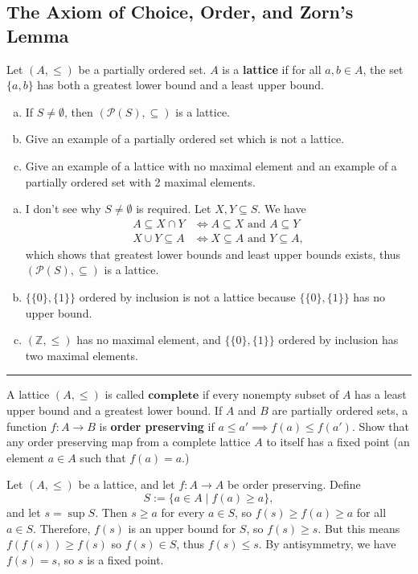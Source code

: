 \subsection{The Axiom of Choice, Order, and Zorn's Lemma}

\begin{exercise}
    Let $(A,\le)$ be a partially ordered set. $A$ is a \textbf{lattice} if for all $a,b\in A$, the set $\{a,b\}$ has both a greatest lower bound and a least upper bound.
    \begin{enumerate}[(a)]
        \item If $S\ne \emptyset$, then $(\mathcal{P}(S),\subseteq)$ is a lattice.
        \item Give an example of a partially ordered set which is not a lattice.
        \item Give an example of a lattice with no maximal element and an example of a partially ordered set with 2 maximal elements.
    \end{enumerate}
\end{exercise}
\begin{solution}
    \begin{enumerate}[(a)]
        \item I don't see why $S\ne\emptyset$ is required. Let $X,Y\subseteq S$. We have 
        \begin{align*}
            A\subseteq X\cap Y &\iff A\subseteq X \text{ and } A\subseteq Y \\
            X\cup Y\subseteq A &\iff X\subseteq A \text{ and } Y\subseteq A, 
        \end{align*}
        which shows that greatest lower bounds and least upper bounds exists, thus $(\mathcal{P}(S),\subseteq)$ is a lattice.
        \item $\{\{0\},\{1\}\}$ ordered by inclusion is not a lattice because $\{\{0\},\{1\}\}$ has no upper bound.
        \item $(\mathbb{Z},\le)$ has no maximal element, and $\{\{0\},\{1\}\}$ ordered by inclusion has two maximal elements.
    \end{enumerate}
\end{solution}
\hrule
\begin{exercise}
    A lattice $(A,\le)$ is called $\textbf{complete}$ if every nonempty subset of $A$ has a least upper bound and a greatest lower bound. If $A$ and $B$ are partially ordered sets, a function $f:A\to B$ is \textbf{order preserving} if $a\le a' \implies f(a)\le f(a')$. Show that any order preserving map from a complete lattice $A$ to itself has a fixed point (an element $a\in A$ such that $f(a) = a$.)
\end{exercise}
\begin{solution}
    Let $(A,\le)$ be a lattice, and let $f:A\to A$ be order preserving. Define $$S := \{a\in A\mid f(a) \ge a\},$$
    and let $s = \sup S$. Then $s \ge a$ for every $a\in S$, so $f(s) \ge f(a) \ge a$ for all $a\in S$. Therefore, $f(s)$ is an upper bound for $S$, so $f(s) \ge s$. But this means $f(f(s)) \ge f(s)$ so $f(s)\in S$, thus $f(s) \le s$. By antisymmetry, we have $f(s) = s$, so $s$ is a fixed point.
\end{solution}

